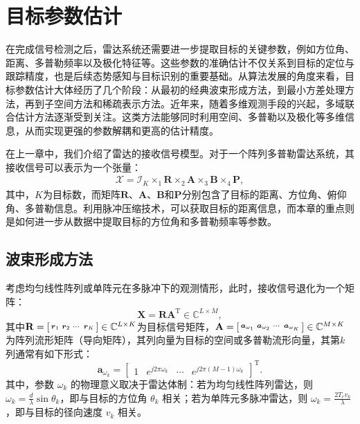 \chapter{目标参数估计}

在完成信号检测之后，雷达系统还需要进一步提取目标的关键参数，例如方位角、距离、多普勒频率以及极化特征等。这些参数的准确估计不仅关系到目标的定位与跟踪精度，也是后续态势感知与目标识别的重要基础。从算法发展的角度来看，目标参数估计大体经历了几个阶段：从最初的经典波束形成方法，到最小方差处理方法，再到子空间方法和稀疏表示方法。近年来，随着多维观测手段的兴起，多域联合估计方法逐渐受到关注。这类方法能够同时利用空间、多普勒以及极化等多维信息，从而实现更强的参数解耦和更高的估计精度。

在上一章中，我们介绍了雷达的接收信号模型。对于一个阵列多普勒雷达系统，其接收信号可以表示为一个张量：
\[
    \begin{split}
        \mathcal{X} = \mathcal{I}_K \times_1 \mathbf{R} \times_2 \mathbf{A} \times_3 \mathbf{B} \times_4 \mathbf{P},
    \end{split}
\]
其中，\( K \)为目标数，而矩阵\( \mathbf{R} \)、\( \mathbf{A} \)、\( \mathbf{B} \)和\( \mathbf{P} \)分别包含了目标的距离、方位角、俯仰角、多普勒信息。利用脉冲压缩技术，可以获取目标的距离信息，而本章的重点则是如何进一步从数据中提取目标的方位角和多普勒频率等参数。

\section{波束形成方法}
考虑均匀线性阵列或单阵元在多脉冲下的观测情形，此时，接收信号退化为一个矩阵：
\[
    \mathbf{X} = \mathbf{R} \mathbf{A}^{\mathrm{T}} \in \mathbb{C}^{L \times M},
\]
其中\( \mathbf{R} = \begin{bsmallmatrix} \boldsymbol{r}_1 & \boldsymbol{r}_2 & \cdots & \boldsymbol{r}_K \end{bsmallmatrix} \in \mathbb{C}^{L \times K} \)为目标信号矩阵，\( \mathbf{A} = \begin{bsmallmatrix} \boldsymbol{a}_{\omega_1} & \boldsymbol{a}_{\omega_2} & \cdots & \boldsymbol{a}_{\omega_K} \end{bsmallmatrix} \in \mathbb{C}^{M \times K} \)为阵列流形矩阵（导向矩阵），其列向量为目标的空间或多普勒流形向量，其第\( k \)列通常有如下形式：
\[
    \bm{a}_{\omega_k} = \begin{bmatrix}
        1 & e^{j 2 \pi \omega_k} & \cdots & e^{j 2 \pi (M-1) \omega_k }
    \end{bmatrix}^{\mathrm{T}}.
\]
其中，参数 $\omega_k$ 的物理意义取决于雷达体制：若为均匀线性阵列雷达，则 $\omega_k = \frac{d}{\lambda}\sin \theta_k$，即与目标的方位角 $\theta_k$ 相关；若为单阵元多脉冲雷达，则 $\omega_k = \frac{2 T_r v_k}{\lambda}$，即与目标的径向速度 $v_k$ 相关。

